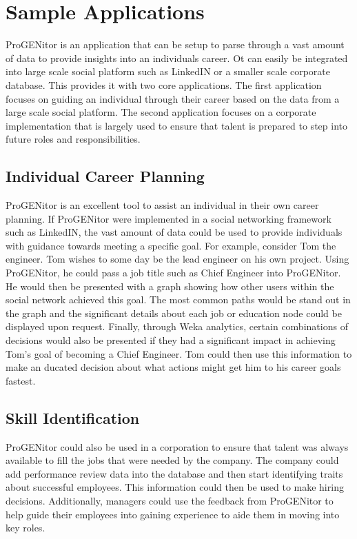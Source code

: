 \section{Sample Applications}
\label{sect:user-stories}
ProGENitor is an application that can be setup to parse through a vast amount
of data to provide insights into an individuals career.  Ot can easily be
integrated into large scale social platform such as LinkedIN or a smaller scale
corporate database.  This provides it with two core applications.  The first
application focuses on guiding an individual through their career based on
the data from a large scale social platform.  The second application focuses on
a corporate implementation that is largely used to ensure that talent is
prepared to step into future roles and responsibilities.

\subsection{Individual Career Planning}
ProGENitor is an excellent tool to assist an individual in their own career
planning.  If ProGENitor were implemented in a social networking framework such
as LinkedIN, the vast amount of data could be used to provide individuals
with guidance towards meeting a specific goal.  For example, consider Tom the
engineer.  Tom wishes to some day be the lead engineer on his own project. 
Using ProGENitor, he could pass a job title such as Chief Engineer into
ProGENitor.  He would then be presented with a graph showing how other users
within the social network achieved this goal.  The most common paths would be
stand out in the graph and the significant details about each job or education
node could be displayed upon request.  Finally, through Weka analytics, certain
combinations of decisions would also be presented if they had a significant
impact in achieving Tom's goal of becoming a Chief Engineer.  Tom could then use
this information to make an  ducated decision about what actions might get him
to his career goals fastest.

\subsection{Skill Identification}
ProGENitor could also be used in a corporation to ensure that talent was always
available to fill the jobs that were needed by the company.  The company could
add performance review data into the database and then start identifying traits
about successful employees.  This information could then be used to make hiring
decisions.  Additionally, managers could use the feedback from ProGENitor to
help guide their employees into gaining experience to aide them in moving into
key roles.
	
